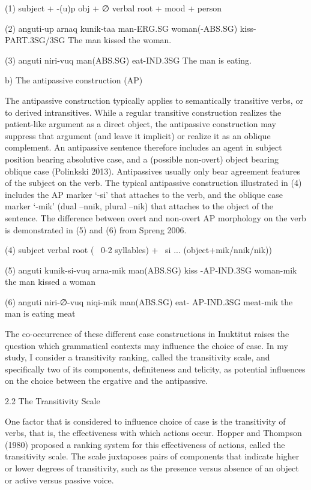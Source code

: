 \documentclass[12pt]{article}
\begin{document}
(1) subject + -(u)p obj + ∅  verbal root + mood + person 

(2) anguti-up 	arnaq 		kunik-taa
man-ERG.SG 	woman(-ABS.SG)   kiss-PART.3SG/3SG
The man kissed the woman.

(3) anguti 		niri-vuq 
man(ABS.SG) eat-IND.3SG
The man is eating.


b) The antipassive construction (AP)

The antipassive construction typically applies to semantically transitive verbs, or to derived intransitives. While a regular transitive construction realizes the patient-like argument as a direct object, the antipassive construction may suppress that argument (and leave it implicit) or realize it as an oblique complement. An antipassive sentence therefore includes an agent in subject position bearing absolutive case, and a (possible non-overt) object bearing oblique case (Polinkski 2013). Antipassives usually only bear agreement features of the subject on the verb. 
The typical antipassive construction illustrated in (4) includes the AP marker ‘-si’ that attaches to the verb, and the oblique case marker ‘-mik’ (dual –nnik, plural –nik) that attaches to the object of the sentence. The difference between overt and non-overt AP morphology on the verb is demonstrated in (5) and (6) from Spreng 2006.

(4) subject  verbal root (~ 0-2 syllables) +  si ... (object+mik/nnik/nik))

(5) anguti 	       kunik-si-vuq 	   arna-mik 
      man(ABS.SG)  kiss -AP-IND.3SG  woman-mik
      the man kissed a woman 

(6)  anguti 	        niri-∅-vuq              niqi-mik 
       man(ABS.SG)  eat- AP-IND.3SG meat-mik
       the man is eating meat

The co-occurrence of these different case constructions in Inuktitut raises the question which grammatical contexts may influence the choice of case. In my study, I consider a transitivity ranking, called the transitivity scale, and specifically two of its components, definiteness and telicity, as potential influences on the choice between the ergative and the antipassive. 


2.2 The Transitivity Scale

One factor that is considered to influence choice of case is the transitivity of verbs, that is, the effectiveness with which actions occur. Hopper and Thompson (1980) proposed a ranking system for this effectiveness of actions, called the transitivity scale. The scale juxtaposes pairs of components that indicate higher or lower degrees of transitivity, such as the presence versus absence of an object or active versus passive voice. 
\end{document}
